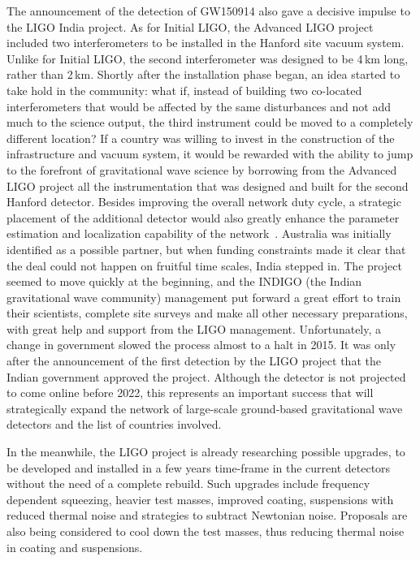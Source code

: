 The announcement of the detection of GW150914 also gave a decisive impulse to the LIGO India project.
As for Initial LIGO, the Advanced LIGO project included two interferometers to be installed in the Hanford site vacuum system.
Unlike for Initial LIGO, the second interferometer was designed to be 4\,km long, rather than 2\,km. 
Shortly after the installation phase began, an idea started to take hold in the community: what if, instead of building two co-located interferometers that would be affected by the same disturbances and not add much to the science output, the third instrument could be moved to a completely different location? 
If a country was willing to invest in the construction of the infrastructure and vacuum system, it would be rewarded with the ability to jump to the forefront of gravitational wave science by borrowing from the Advanced LIGO project all the instrumentation that was designed and built for the second Hanford detector. 
Besides improving the overall network duty cycle, a strategic placement of the additional detector would also greatly enhance the parameter estimation and localization capability of the network~\cite{Klimenko_2016}.
Australia was initially identified as a possible partner, but when funding constraints made it clear that the deal could not happen on fruitful time scales, India stepped in.
The project seemed to move quickly at the beginning, and the INDIGO (the Indian gravitational wave community) management put forward a great effort to train their scientists, complete site surveys and make all other necessary preparations, with great help and support from the LIGO management. 
Unfortunately, a change in government slowed the process almost to a halt in 2015. 
It was only after the announcement of the first detection by the LIGO project that the Indian government approved the project. 
Although the detector is not projected to come online before 2022, this represents an important success that will strategically expand the network of large-scale ground-based gravitational wave detectors and the list of countries involved.

In the meanwhile, the LIGO project is already researching possible upgrades, to be developed and installed in a few years time-frame in the current detectors without the need of a complete rebuild.
Such upgrades include frequency dependent squeezing, heavier test masses, improved coating, suspensions with reduced thermal noise and strategies to subtract Newtonian noise.
Proposals are also being considered to cool down the test masses, thus reducing thermal noise in coating and suspensions.

